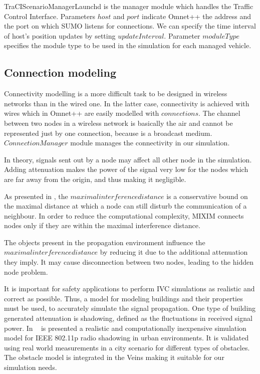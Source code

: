 TraCIScenarioManagerLaunchd is the manager module which handles the Traffic
Control Interface. Parameters $host$ and $port$ indicate Omnet++ the address and
the port on which SUMO listens for connections. We can specify the time interval
of host's position updates by setting $updateInterval$. Parameter $moduleType$
specifies the module type to be used in the simulation for each managed vehicle.

\subsection{Connection modeling}

Connectivity modelling is a more difficult task to be designed in wireless
networks than in the wired one. In the latter case, connectivity is achieved with wires
which in Omnet++ are easily modelled with $connections$. The channel between two
nodes in a wireless network is basically the air and cannot be represented just
by one connection, because is a broadcast medium. $ConnectionManager$ module
manages the connectivity in our simulation.

In theory, signals sent out by a node may affect all other node in the
simulation. Adding attenuation makes the power of the signal very low for the
nodes which are far away from the origin, and thus making it negligible.

As presented in \cite{Kopke}, the $maximal interference distance$ is a
conservative bound on the maximal distance at which a node can still disturb the
communication of a neighbour. In order to reduce the computational complexity,
MIXIM connects nodes only if they are within the maximal interference distance.

The objects present in the propagation environment influence the $maximal
interference distance$ by reducing it due to the additional attenuation they
imply. It may cause disconnection between two nodes, leading to the hidden node
problem.

It is important for safety applications to perform IVC simulations as realistic
and correct as possible. Thus, a model for modeling buildings and their
properties must be used, to accurately simulate the signal propagation. One
type of building generated attenuation is shadowing, defined as the fluctuations
in received signal power. In ~\cite{sommer2011computationally} is presented a
realistic and computationally inexpensive simulation model for IEEE 802.11p
radio shadowing in urban environments. It is validated using real world
measurements in a city scenario for different types of obstacles. The obstacle
model is integrated in the Veins making it suitable for our simulation needs.

